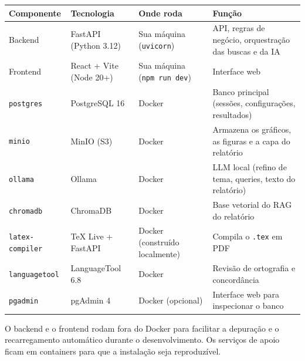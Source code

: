 \documentclass[
  brazilian,
  a4paper,12pt,oneside]{report}
\newcounter{none} %
\begin{document}
{\def\LTcaptype{none} %
\begin{longtable}[]{@{}
  >{\raggedright\arraybackslash}p{}
  >{\raggedright\arraybackslash}p{}
  >{\raggedright\arraybackslash}p{}
  >{\raggedright\arraybackslash}p{}@{}}
\toprule\noalign{}
\begin{minipage}[b]{\linewidth}\raggedright
Componente
\end{minipage} & \begin{minipage}[b]{\linewidth}\raggedright
Tecnologia
\end{minipage} & \begin{minipage}[b]{\linewidth}\raggedright
Onde roda
\end{minipage} & \begin{minipage}[b]{\linewidth}\raggedright
Função
\end{minipage} \\
\midrule\noalign{}
\endhead
\bottomrule\noalign{}
\endlastfoot
Backend & FastAPI (Python 3.12) & Sua máquina (\texttt{uvicorn}) & API,
regras de negócio, orquestração das buscas e da IA \\
Frontend & React + Vite (Node 20+) & Sua máquina
(\texttt{npm\ run\ dev}) & Interface web \\
\texttt{postgres} & PostgreSQL 16 & Docker & Banco principal (sessões,
configurações, resultados) \\
\texttt{minio} & MinIO (S3) & Docker & Armazena os gráficos, as figuras
e a capa do relatório \\
\texttt{ollama} & Ollama & Docker & LLM local (refino de tema, queries,
texto do relatório) \\
\texttt{chromadb} & ChromaDB & Docker & Base vetorial do RAG do
relatório \\
\texttt{latex-}\allowbreak{}\texttt{compiler} & TeX Live + FastAPI &
Docker (construído localmente) & Compila o
\texttt{.}\allowbreak{}\texttt{tex} em PDF \\
\texttt{languagetool} & LanguageTool 6.8 & Docker & Revisão de
ortografia e concordância \\
\texttt{pgadmin} & pgAdmin 4 & Docker (opcional) & Interface web para
inspecionar o banco \\
\end{longtable}
}

O backend e o frontend rodam fora do Docker para facilitar a depuração e
o recarregamento automático durante o desenvolvimento. Os serviços de
apoio ficam em containers para que a instalação seja reproduzível.
\end{document}
